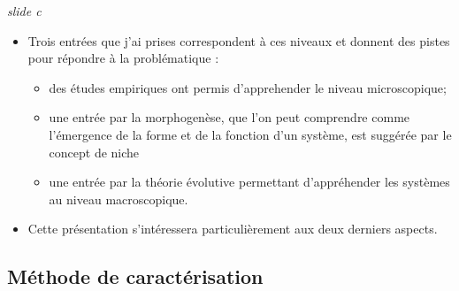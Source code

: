 \documentclass[12pt]{article}
\begin{document}
\newpage

\textit{slide c}

\begin{itemize}	
	\item Trois entrées que j'ai prises correspondent à ces niveaux et donnent des pistes pour répondre à la problématique : 
		\begin{itemize}
			\item des études empiriques ont permis d'apprehender le niveau microscopique;
			\item une entrée par la morphogenèse, que l'on peut comprendre comme l'émergence de la forme et de la fonction d'un système, est suggérée par le concept de niche 
			\item une entrée par la théorie évolutive permettant d'appréhender les systèmes au niveau macroscopique.
		\end{itemize}
	\item Cette présentation s'intéressera particulièrement aux deux derniers aspects.
\end{itemize}


\newpage





\subsection*{Méthode de caractérisation}
\end{document}
